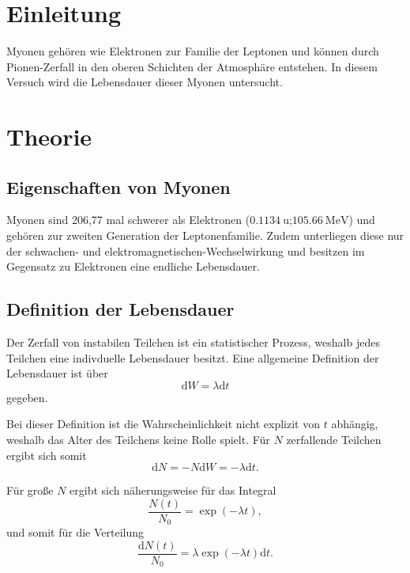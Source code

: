 \section{Einleitung} %
\label{sec:einleitung}

Myonen gehören wie Elektronen zur Familie der Leptonen und können durch Pionen-Zerfall in den oberen Schichten der Atmosphäre entstehen.
In diesem Versuch wird die Lebensdauer dieser Myonen untersucht.

\section{Theorie} %
\label{sec:theorie}
\FloatBarrier
\subsection{Eigenschaften von Myonen} %
\label{sub:eigenschaften_von_myonen}

Myonen sind 206,77 mal schwerer als Elektronen ($\SI{0.1134}{\atomicmassunit}$;$\SI{105.66}{\mega\electronvolt}$) und gehören zur zweiten Generation der Leptonenfamilie.
Zudem unterliegen diese nur der schwachen- und elektromagnetischen-Wechselwirkung und besitzen im Gegensatz zu Elektronen eine endliche Lebensdauer.
\FloatBarrier
\subsection{Definition der Lebensdauer} %
\label{sub:definition_der_lebensdauer}

Der Zerfall von instabilen Teilchen ist ein statistischer Prozess, weshalb jedes Teilchen eine indivduelle Lebensdauer besitzt.
Eine allgemeine Definition der Lebensdauer ist über
\begin{equation*}
	\text{d}W = \lambda \text{d}t
\end{equation*}
gegeben.

Bei dieser Definition ist die Wahrscheinlichkeit nicht explizit von $t$ abhängig, weshalb das Alter des Teilchens keine Rolle spielt.
Für $N$ zerfallende Teilchen ergibt sich somit
\begin{equation*}
	\text{d}N = -N \text{d}W = -\lambda \text{d}t.
\end{equation*}

Für große $N$ ergibt sich näherungsweise für das Integral
\begin{equation}
	\label{eqn:exponential}
	\frac{N(t)}{N_\text{0}} = \exp{(-\lambda t)},
\end{equation}
und somit für die Verteilung
\begin{equation*}
	\frac{\text{d}N(t)}{N_\text{0}} = \lambda \exp{(-\lambda t)} \text{d}t .
\end{equation*}

